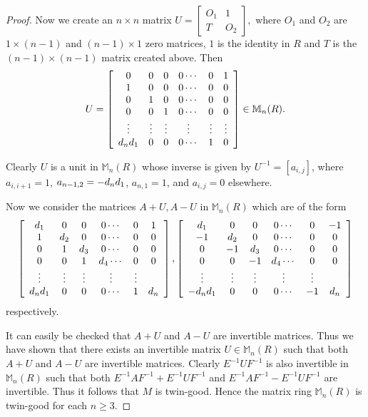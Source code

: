 \documentclass{amsart}
\begin{document}
\begin{proof}
\noindent  Now we create an $n\times n$ matrix $U = \left[
\begin{array}{cc}
O_1 & 1 \\
T & O_2
\end{array}
\right],
$
where $O_1$ and $O_2$ are $1\times (n-1)$ and  $(n-1)\times 1$ zero matrices, $1$ is the identity in $R$ and $T$ is the $(n-1)\times (n-1)$ matrix created above.
Then \[U=\left[\begin{array}{cccccc}
0&0&0&0\cdots&0&1 \\1&0&0&0\cdots&0&0\\  0&1&0&0\cdots&0&0 \\ 0&0&1&0\cdots&0&0 \\   \vdots  &\vdots   &\vdots &\vdots   &\vdots &\vdots \\ d_n\*d_1&0&0&0\cdots&1&0\\ \end{array}\right]\in \mathbb M_n(R).\]

\noindent Clearly $U$ is a unit in $\mathbb M_{n}(R)$ whose inverse is given by $U^{-1}=[a_{i,j}]$, where $a_{i,i+1}=1$, $a_{n-1, 2}=-d_n\*d_1$, $a_{n,1}=1$, and $a_{i,j}=0$ elsewhere.

\noindent  Now we consider the matrices $A+U, A-U$ in $\mathbb M_{n}(R)$ which are of the form \[\left[\begin{array}{cccccc}
d_1&0&0&0\cdots&0&1 \\1&d_2&0&0\cdots&0&0\\  0&1&d_3&0\cdots&0&0 \\ 0&0&1&d_4\cdots&0&0 \\   \vdots  &\vdots   &\vdots &\vdots   &\vdots  \\ d_n\*d_1&0&0&0\cdots&1&d_n\\ \end{array}\right]
, \left[\begin{array}{cccccc}
d_1&0&0&0\cdots&0&-1 \\-1&d_2&0&0\cdots&0&0\\  0&-1&d_3&0\cdots&0&0 \\ 0&0&-1&d_4\cdots&0&0 \\   \vdots  &\vdots   &\vdots &\vdots   &\vdots  \\ -d_n\*d_1&0&0&0\cdots&-1&d_n\\ \end{array}\right]\] respectively.
 
 It can easily be checked that $A+U$ and $A-U$ are invertible matrices. Thus we have shown that there exists an invertible matrix $U \in \mathbb M_n(R)$ such that both $A+U$ and $A-U$ are invertible matrices. Clearly $E^{-1}UF^{-1}$ is also invertible in $\mathbb M_n(R)$ such that both $E^{-1}AF^{-1} + E^{-1}UF^{-1}$ and $E^{-1}AF^{-1} - E^{-1}UF^{-1}$ are invertible. Thus it follows that $M$ is twin-good. Hence the matrix ring $\mathbb M_n(R)$ is twin-good for each $n \ge 3$.
\end{proof}
\end{document}
